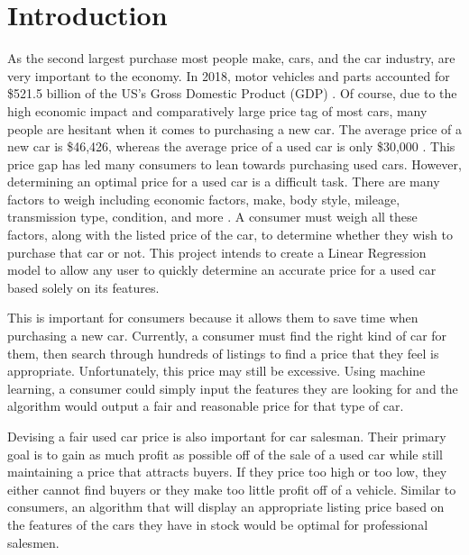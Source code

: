 \documentclass[compsoc]{IEEEtran}
\begin{document}
\maketitle
\IEEEdisplaynontitleabstractindextext
\section{Introduction}
As the second largest purchase most people make, cars, and the car industry, are very important to the economy. In 2018, motor vehicles and parts accounted for \$521.5 billion of the US's Gross Domestic Product (GDP) \cite{website:auto_industry}. Of course, due to the high economic impact and comparatively large price tag of most cars, many people are hesitant when it comes to purchasing a new car. The average price of a new car is \$46,426, whereas the average price of a used car is only \$30,000 \cite{website:car_prices}. This price gap has led many consumers to lean towards purchasing used cars. However, determining an optimal price for a used car is a difficult task. There are many factors to weigh including economic factors, make, body style, mileage, transmission type, condition, and more \cite{website:value_factors}. A consumer must weigh all these factors, along with the listed price of the car, to determine whether they wish to purchase that car or not. This project intends to create a Linear Regression model \cite{model:multiple_linear_regression} to allow any user to quickly determine an accurate price for a used car based solely on its features.

This is important for consumers because it allows them to save time when purchasing a new car. Currently, a consumer must find the right kind of car for them, then search through hundreds of listings to find a price that they feel is appropriate. Unfortunately, this price may still be excessive. Using machine learning, a consumer could simply input the features they are looking for and the algorithm would output a fair and reasonable price for that type of car. 

Devising a fair used car price is also important for car salesman. Their primary goal is to gain as much profit as possible off of the sale of a used car while still maintaining a price that attracts buyers. If they price too high or too low, they either cannot find buyers or they make too little profit off of a vehicle. Similar to consumers, an algorithm that will display an appropriate listing price based on the features of the cars they have in stock would be optimal for professional salesmen.
\end{document}
